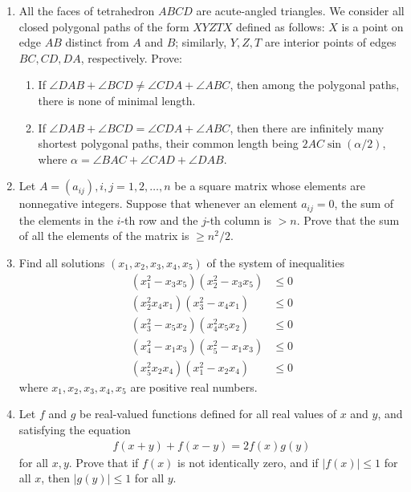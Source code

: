 \documentclass[12pt,-letter paper]{article}
\begin{document}
\begin{enumerate}

\item All the faces of tetrahedron $ABCD$ are acute-angled triangles. We consider all closed polygonal paths of the form $XYZTX$ defined as follows: $X$ is a point on edge $AB$ distinct from $A$ and $B$; similarly, $Y, Z, T$ are interior points of edges $BC, CD, DA$, respectively. Prove:\\
\begin{enumerate}[label={$\brak{\Alph*}$}] \item If $\angle DAB + \angle BCD \neq \angle CDA + \angle ABC$, then among the polygonal paths, there is none of minimal length. \item If $\angle DAB + \angle BCD = \angle CDA + \angle ABC$, then there are infinitely
many shortest polygonal paths, their common length being $2AC \sin(\alpha/2)$, where $\alpha = \angle BAC + \angle CAD + \angle DAB$. \end {enumerate}

\item Let $A = (a_{ij}), i, j = 1, 2, \ldots, n$ be a square matrix whose elements are nonnegative integers. Suppose that whenever an element $a_{ij} = 0$, the sum of the elements in the $i$-th row and the $j$-th column is $> n$. Prove that the sum of all the elements of the matrix is $\geq n^2/2$.

\item Find all solutions $(x_{1}, x_{2}, x_{3}, x_{4}, x_{5})$ of the system of inequalities \\
\begin{align} (x^2_{1} - x_{3}x_{5})(x^2_{2} - x_{3}x_{5}) &\leq 0 \\ (x^2_{2} x_{4}x_{1})(x^2_{3} - x_{4}x_{1}) &\leq 0 \\ (x^2_{3} - x_{5}x_{2})(x^2_{4} x_{5}x_{2}) &\leq 0 \\ (x^2_{4} - x_{1}x_{3})(x^2_{5} - x_{1}x_{3}) &\leq 0 \\ (x^2_{5} x_{2}x_{4})(x^2_{1} - x_{2}x_{4}) &\leq 0
\end{align} where $x_{1}, x_{2}, x_{3}, x_{4}, x_{5}$ are positive real numbers.
\item Let $f$ and $g$ be real-valued functions defined for all real values of $x$ and $y$, and satisfying the equation \begin{align} f(x+y) + f(x-y) = 2f(x)g(y)\end{align} for all $x, y$. Prove that if $f(x)$ is not identically zero, and if $|f(x)| \leq 1$ for all $x$, then $|g(y)| \leq 1$ for all $y$.



\end{enumerate}
\end{document}
